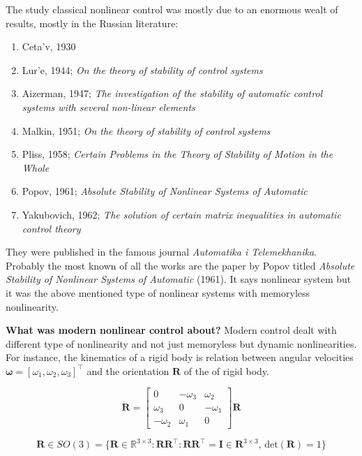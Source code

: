 \documentclass{article}
\begin{document}
The study classical nonlinear control was mostly due to an enormous wealt of results, mostly in the Russian literature:
\begin{enumerate}
    \item Ceta'v, 1930
    \item Lur'e, 1944; \textit{On the theory of stability of control systems}
    \item Aizerman, 1947; \textit{The investigation of the stability of automatic control systems with several non-linear elements}
    \item Malkin, 1951; \textit{On the theory of stability of control systems}
    \item Pliss, 1958; \textit{Certain Problems in the Theory of Stability of Motion in the Whole}
    \item Popov, 1961; \textit{Absolute Stability of Nonlinear Systems of Automatic}
    \item Yakubovich, 1962; \textit{The solution of certain matrix inequalities in automatic control theory}
\end{enumerate}

They were published in the famous journal \textit{Automatika i Telemekhanika}. Probably the most known of all the works are the paper by Popov titled \textit{Absolute Stability of Nonlinear Systems of Automatic} (1961). It says nonlinear system but it was the above mentioned type of nonlinear systems with memoryless nonlinearity.

\noindent
\textbf{What was modern nonlinear control about?}
Modern control dealt with different type of nonlinearity and not just memoryless but dynamic nonlinearities. For instance, the kinematics of a rigid body is relation between angular velocities $\bm{\omega}=[\omega_{1}, \omega_{2}, \omega_{3}]^{\intercal}$ and the orientation $\bm{R}$ of the of rigid body.

\begin{equation*}
    \dot{\bm{R}}=
    \begin{bmatrix}
        0&-\omega_{3}&\omega_{2}\\
        \omega_{3}&0&-\omega_{1}\\
        -\omega_{2}&\omega_{1}&0
    \end{bmatrix}
    \bm{R}
\end{equation*}

$$
\bm{R}\in SO(3)=\{\bm{R}\in\mathbb{R}^{3\times3}:\bm{R}\bm{R}^{\intercal}:\bm{R}\bm{R}^{\intercal}=\bm{I}\in\mathbb{\bm{R}}^{3\times3},\,\text{det}(\bm{R})=1\}
$$
\end{document}
